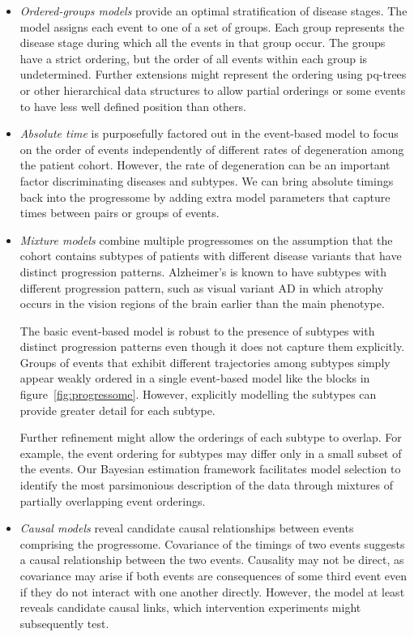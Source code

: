 \documentclass[a4paper,11pt]{article}
\begin{document}
\begin{itemize}

\item \emph{Ordered-groups models} provide an optimal stratification
of disease stages.  The model assigns each event to one of a set of
groups.  Each group represents the disease stage during which all the
events in that group occur.  The groups have a strict ordering, but
the order of all events within each group is undetermined.  Further
extensions might represent the ordering using pq-trees or other
hierarchical data structures to allow partial orderings or some events
to have less well defined position than others.

\item \emph{Absolute time} is purposefully factored out in the
event-based model to focus on the order of events independently of
different rates of degeneration among the patient cohort.  However,
the rate of degeneration can be an important factor discriminating
diseases and subtypes.  We can bring absolute timings back into the
progressome by adding extra model parameters that capture times
between pairs or groups of events.

\item \emph{Mixture models} combine multiple progressomes on the
assumption that the cohort contains subtypes of patients with
different disease variants that have distinct progression patterns.
Alzheimer's is known to have subtypes with different progression
pattern, such as visual variant AD in which atrophy occurs in
the vision regions of the brain earlier than the main phenotype.

The basic event-based model is robust to the presence of subtypes with
distinct progression patterns even though it does not capture them
explicitly.  Groups of events that exhibit different trajectories
among subtypes simply appear weakly ordered in a single event-based
model like the blocks in figure~\ref{fig:progressome}.  However,
explicitly modelling the subtypes can provide greater detail for each
subtype.

Further refinement might allow the orderings of each subtype to
overlap.  For example, the event ordering for subtypes may differ only
in a small subset of the events.  Our Bayesian estimation framework
facilitates model selection to identify the most parsimonious
description of the data through mixtures of partially overlapping
event orderings.

\item \emph{Causal models} reveal candidate causal relationships
between events comprising the progressome.  Covariance of the timings
of two events suggests a causal relationship between the two events.
Causality may not be direct, as covariance may arise if both events
are consequences of some third event even if they do not interact with
one another directly.  However, the model at least reveals candidate
causal links, which intervention experiments might subsequently test.

\end{itemize}
\end{document}
